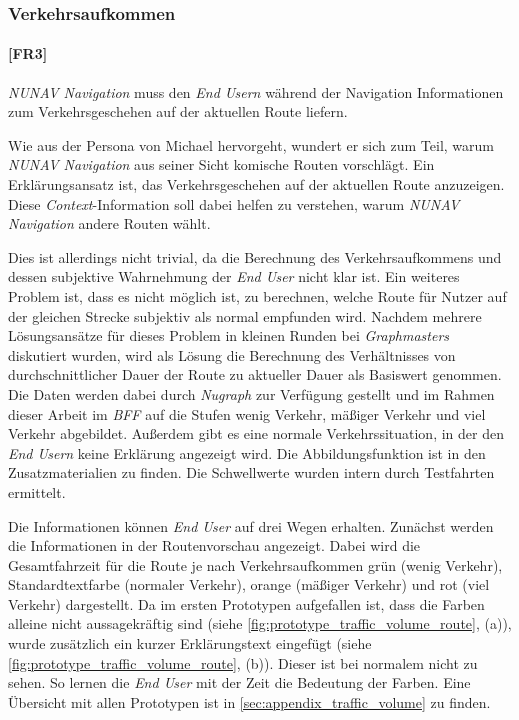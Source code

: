 \subsubsection{Verkehrsaufkommen}
\label{sec:traffic_volume_definition}

\paragraph{[FR3]} \textit{NUNAV Navigation} muss den \textit{End Usern} während der Navigation Informationen zum Verkehrsgeschehen auf der aktuellen Route liefern.

Wie aus der Persona von Michael hervorgeht, wundert er sich zum Teil, warum \textit{NUNAV Navigation} aus seiner Sicht \glqq komische\grqq{} Routen vorschlägt. Ein Erklärungsansatz ist, das Verkehrsgeschehen auf der aktuellen Route anzuzeigen. Diese \textit{Context}-Information soll dabei helfen zu verstehen, warum \textit{NUNAV Navigation} andere Routen wählt. 

Dies ist allerdings nicht trivial, da die Berechnung des Verkehrsaufkommens und dessen subjektive Wahrnehmung der \textit{End User} nicht klar ist. Ein weiteres Problem ist, dass es nicht möglich ist, zu berechnen, welche Route für Nutzer auf der gleichen Strecke subjektiv als \glqq normal\grqq{} empfunden wird. Nachdem mehrere Lösungsansätze für dieses Problem in kleinen Runden bei \textit{Graphmasters} diskutiert wurden, wird als Lösung die Berechnung des Verhältnisses von durchschnittlicher Dauer der Route zu aktueller Dauer als Basiswert genommen. Die Daten werden dabei durch \textit{Nugraph} zur Verfügung gestellt und im Rahmen dieser Arbeit im \textit{BFF} auf die Stufen \glqq wenig Verkehr\grqq{}, \glqq mäßiger Verkehr\grqq{} und \glqq viel Verkehr\grqq{} abgebildet. Außerdem gibt es eine \glqq normale\grqq{} Verkehrssituation, in der den \textit{End Usern} keine Erklärung angezeigt wird. Die Abbildungsfunktion ist in den Zusatzmaterialien zu finden. Die Schwellwerte wurden intern durch Testfahrten ermittelt.

Die Informationen können \textit{End User} auf drei Wegen erhalten. Zunächst werden die Informationen in der Routenvorschau angezeigt. Dabei wird die Gesamtfahrzeit für die Route je nach Verkehrsaufkommen grün (wenig Verkehr), Standardtextfarbe (normaler Verkehr), orange (mäßiger Verkehr) und rot (viel Verkehr) dargestellt. Da im ersten Prototypen aufgefallen ist, dass die Farben alleine nicht aussagekräftig sind (siehe \autoref{fig:prototype_traffic_volume_route}, (a)), wurde zusätzlich ein kurzer Erklärungstext eingefügt (siehe \autoref{fig:prototype_traffic_volume_route}, (b)). Dieser ist bei \glqq normalem\grqq{} nicht zu sehen. So lernen die \textit{End User} mit der Zeit die Bedeutung der Farben. Eine Übersicht mit allen Prototypen ist in \autoref{sec:appendix_traffic_volume} zu finden.

